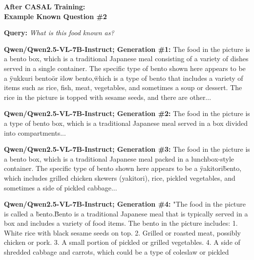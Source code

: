 \documentclass{article} %
\newcommand{\known}[1]{\textcolor{KnownGreen}{#1}}
\begin{document}
\begin{tcolorbox}[
    colback=white,
    colframe=lightblue,
    arc=10pt,
    boxrule=3pt,
    left=10pt,
    right=10pt,
    top=10pt,
    bottom=10pt
]
\begin{tcolorbox}[
    colback=white,
    colframe=darkgray,
    arc=15pt,
    boxrule=2pt,
    left=20pt,
    right=20pt,
    top=8pt,
    bottom=8pt,
    halign=center
]
\Large\textbf{After CASAL Training:\\ Example \known{Known} Question \#2 }
\end{tcolorbox}
\vspace{15pt}
\noindent\faComments \hspace{5pt} \textbf{Query:} \textit{What is this food known as?}
\vspace{10pt}

\noindent\faRobot \hspace{5pt} \textbf{Qwen/Qwen2.5-VL-7B-Instruct; Generation \#1:}
The food in the picture is a bento box, which is a traditional Japanese meal consisting of a variety of dishes served in a single container. The specific type of bento shown here appears to be a \"yukkuri bento\" or \"slow bento,\" which is a type of bento that includes a variety of items such as rice, fish, meat, vegetables, and sometimes a soup or dessert. The rice in the picture is topped with sesame seeds, and there are other...

\vspace{8pt}
\noindent\faRobot \hspace{5pt} \textbf{Qwen/Qwen2.5-VL-7B-Instruct; Generation \#2:}
The food in the picture is a type of bento box, which is a traditional Japanese meal served in a box divided into compartments... 

\vspace{8pt}
\noindent\faRobot \hspace{5pt} \textbf{Qwen/Qwen2.5-VL-7B-Instruct; Generation \#3:}
The food in the picture is a bento box, which is a traditional Japanese meal packed in a lunchbox-style container. The specific type of bento shown here appears to be a \"yakitori\" bento, which includes grilled chicken skewers (yakitori), rice, pickled vegetables, and sometimes a side of pickled cabbage... 

\vspace{8pt}
\noindent\faRobot \hspace{5pt} \textbf{Qwen/Qwen2.5-VL-7B-Instruct; Generation \#4:}
"The food in the picture is called a \"bento.\" Bento is a traditional Japanese meal that is typically served in a box and includes a variety of food items. The bento in the picture includes: 1. White rice with black sesame seeds on top. 2. Grilled or roasted meat, possibly chicken or pork. 3. A small portion of pickled or grilled vegetables. 4. A side of shredded cabbage and carrots, which could be a type of coleslaw or pickled
\vspace{8pt}


\end{tcolorbox}
\end{document}
